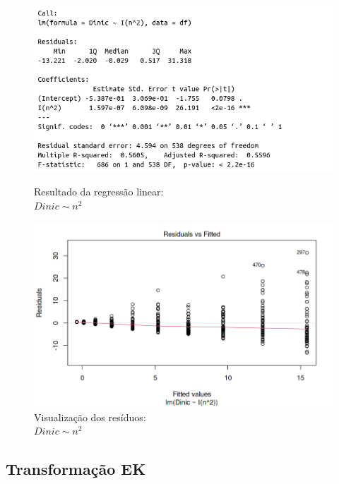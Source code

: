 \documentclass{uofa-eng-assignment}
\begin{document}
\begin{figure}[h]
    \centering
    \begin{minipage}{0.45\textwidth}
        \centering
        \includegraphics[width=1.2\textwidth]{dinic_n^2_lm.png}
        \captionsetup{justification=centering}
        \caption{Resultado da regressão linear: \\$Dinic \sim n^2$}
        \label{fig:dinic-regression-2}
    \end{minipage}
    \hfill
    \begin{minipage}{0.45\textwidth}
        \centering
        \includegraphics[width=1\textwidth]{dinic_n^2_residuals.png}
        \captionsetup{justification=centering}
        \caption{Visualização dos resíduos: \\$Dinic \sim n^2$}
        \label{fig:dinic-residuals}
    \end{minipage}
\end{figure}





\WFclear
\newpage
\subsection{Transformação EK}
\end{document}
